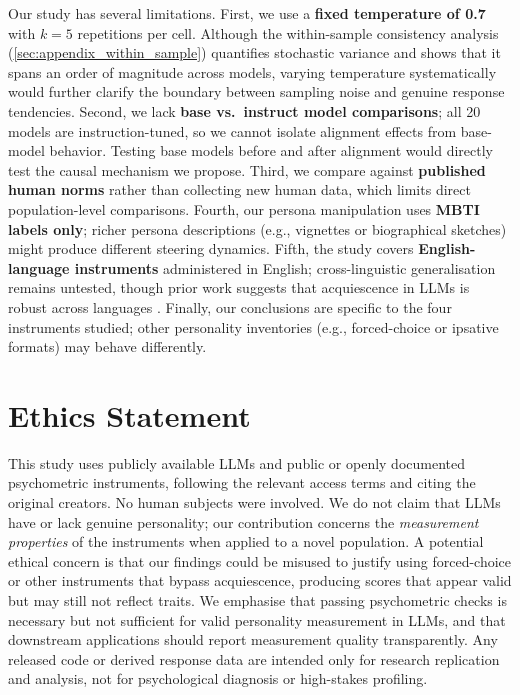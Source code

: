 \documentclass[11pt]{article}
\begin{document}
Our study has several limitations. First, we use a \textbf{fixed temperature of 0.7} with $k{=}5$ repetitions per cell. Although the within-sample consistency analysis (\cref{sec:appendix_within_sample}) quantifies stochastic variance and shows that it spans an order of magnitude across models, varying temperature systematically would further clarify the boundary between sampling noise and genuine response tendencies. Second, we lack \textbf{base vs.\ instruct model comparisons}; all 20 models are instruction-tuned, so we cannot isolate alignment effects from base-model behavior. Testing base models before and after alignment would directly test the causal mechanism we propose. Third, we compare against \textbf{published human norms} rather than collecting new human data, which limits direct population-level comparisons. Fourth, our persona manipulation uses \textbf{MBTI labels only}; richer persona descriptions (e.g., vignettes or biographical sketches) might produce different steering dynamics. Fifth, the study covers \textbf{English-language instruments} administered in English; cross-linguistic generalisation remains untested, though prior work suggests that acquiescence in LLMs is robust across languages \citep{acquiescence2025emnlp}. Finally, our conclusions are specific to the four instruments studied; other personality inventories (e.g., forced-choice or ipsative formats) may behave differently.

\section*{Ethics Statement}

This study uses publicly available LLMs and public or openly documented psychometric instruments, following the relevant access terms and citing the original creators. No human subjects were involved. We do not claim that LLMs have or lack genuine personality; our contribution concerns the \emph{measurement properties} of the instruments when applied to a novel population. A potential ethical concern is that our findings could be misused to justify using forced-choice or other instruments that bypass acquiescence, producing scores that appear valid but may still not reflect traits. We emphasise that passing psychometric checks is necessary but not sufficient for valid personality measurement in LLMs, and that downstream applications should report measurement quality transparently. Any released code or derived response data are intended only for research replication and analysis, not for psychological diagnosis or high-stakes profiling.
\end{document}
